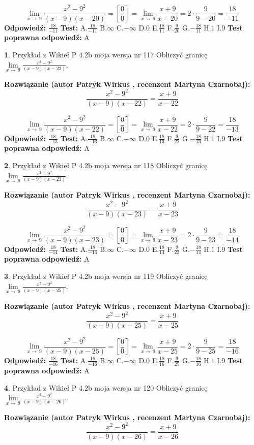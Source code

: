 \documentclass[12pt, a4paper]{article}
\theoremstyle{definition} %
\newtheorem{zad}{}
\newcommand{\zadStart}[1]{\begin{zad}#1\newline}
\newcommand{\zadStop}{\end{zad}}
\newcommand{\rozwStart}[2]{\noindent \textbf{Rozwiązanie (autor #1 , recenzent #2): }\newline}
\newcommand{\rozwStop}{\newline}
\newcommand{\odpStart}{\noindent \textbf{Odpowiedź:}\newline}
\newcommand{\odpStop}{\newline}
\newcommand{\testStart}{\noindent \textbf{Test:}\newline}
\newcommand{\testStop}{\newline}
\newcommand{\kluczStart}{\noindent \textbf{Test poprawna odpowiedź:}\newline}
\newcommand{\kluczStop}{\newline}
\begin{document}
$$\lim\limits_{x\to\ 9}\frac{x^{2}-9^{2}}{(x-9)(x-20)}=[\frac{0}{0}]=\lim\limits_{x\to\ 9}\frac{x+9}{x-20}=2 \cdot \frac{9}{9-20} = \frac{18}{-11}$$
\rozwStop
\odpStart
$\frac{18}{-11}$
\odpStop
\testStart
A.$\frac{18}{-11}$
B.$\infty$
C.$-\infty$
D.$0$
E.$\frac{18}{11}$
F.$\frac{9}{20}$
G.$-\frac{18}{11}$
H.$1$
I.$9$
\testStop
\kluczStart
A
\kluczStop



\zadStart{Przykład z Wikieł P 4.2b moja wersja nr 117}
Obliczyć granicę $\lim\limits_{x\to\ 9}\frac{x^{2}-9^{2}}{(x-9)(x-22)}$.
\zadStop
\rozwStart{Patryk Wirkus}{Martyna Czarnobaj}
$$\frac{x^{2}-9^{2}}{(x-9)(x-22)}=\frac{x+9}{x-22}$$

$$\lim\limits_{x\to\ 9}\frac{x^{2}-9^{2}}{(x-9)(x-22)}=[\frac{0}{0}]=\lim\limits_{x\to\ 9}\frac{x+9}{x-22}=2 \cdot \frac{9}{9-22} = \frac{18}{-13}$$
\rozwStop
\odpStart
$\frac{18}{-13}$
\odpStop
\testStart
A.$\frac{18}{-13}$
B.$\infty$
C.$-\infty$
D.$0$
E.$\frac{18}{13}$
F.$\frac{9}{22}$
G.$-\frac{18}{13}$
H.$1$
I.$9$
\testStop
\kluczStart
A
\kluczStop



\zadStart{Przykład z Wikieł P 4.2b moja wersja nr 118}
Obliczyć granicę $\lim\limits_{x\to\ 9}\frac{x^{2}-9^{2}}{(x-9)(x-23)}$.
\zadStop
\rozwStart{Patryk Wirkus}{Martyna Czarnobaj}
$$\frac{x^{2}-9^{2}}{(x-9)(x-23)}=\frac{x+9}{x-23}$$

$$\lim\limits_{x\to\ 9}\frac{x^{2}-9^{2}}{(x-9)(x-23)}=[\frac{0}{0}]=\lim\limits_{x\to\ 9}\frac{x+9}{x-23}=2 \cdot \frac{9}{9-23} = \frac{18}{-14}$$
\rozwStop
\odpStart
$\frac{18}{-14}$
\odpStop
\testStart
A.$\frac{18}{-14}$
B.$\infty$
C.$-\infty$
D.$0$
E.$\frac{18}{14}$
F.$\frac{9}{23}$
G.$-\frac{18}{14}$
H.$1$
I.$9$
\testStop
\kluczStart
A
\kluczStop



\zadStart{Przykład z Wikieł P 4.2b moja wersja nr 119}
Obliczyć granicę $\lim\limits_{x\to\ 9}\frac{x^{2}-9^{2}}{(x-9)(x-25)}$.
\zadStop
\rozwStart{Patryk Wirkus}{Martyna Czarnobaj}
$$\frac{x^{2}-9^{2}}{(x-9)(x-25)}=\frac{x+9}{x-25}$$

$$\lim\limits_{x\to\ 9}\frac{x^{2}-9^{2}}{(x-9)(x-25)}=[\frac{0}{0}]=\lim\limits_{x\to\ 9}\frac{x+9}{x-25}=2 \cdot \frac{9}{9-25} = \frac{18}{-16}$$
\rozwStop
\odpStart
$\frac{18}{-16}$
\odpStop
\testStart
A.$\frac{18}{-16}$
B.$\infty$
C.$-\infty$
D.$0$
E.$\frac{18}{16}$
F.$\frac{9}{25}$
G.$-\frac{18}{16}$
H.$1$
I.$9$
\testStop
\kluczStart
A
\kluczStop



\zadStart{Przykład z Wikieł P 4.2b moja wersja nr 120}
Obliczyć granicę $\lim\limits_{x\to\ 9}\frac{x^{2}-9^{2}}{(x-9)(x-26)}$.
\zadStop
\rozwStart{Patryk Wirkus}{Martyna Czarnobaj}
$$\frac{x^{2}-9^{2}}{(x-9)(x-26)}=\frac{x+9}{x-26}$$
\end{document}
